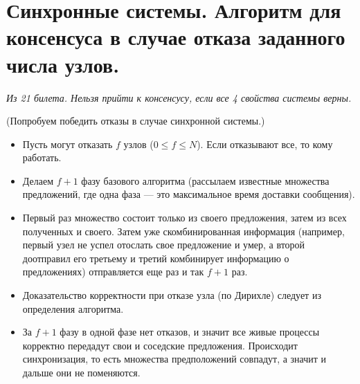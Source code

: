 \section{Синхронные системы. Алгоритм для консенсуса в случае отказа заданного числа узлов.}

\textit{ Из 21 билета. Нельзя прийти к консенсусу, если все 4 свойства системы верны. }

\begin{algorithm} (Попробуем победить отказы в случае синхронной системы.)
    \begin{itemize}
        \item Пусть могут отказать $f$ узлов ($0 \leq f \le N$). Если отказывают все, то кому работать.
        \item Делаем $f + 1$ фазу базового алгоритма (рассылаем известные множества предложений,
            где одна фаза --- это максимальное время доставки сообщения).
        \item Первый раз множество состоит только из своего предложения, затем из всех полученных и своего.
            Затем уже скомбинированная информация (например, первый узел не успел отослать свое предложение и умер,
            а второй доотправил его третьему и третий комбинирует информацию о предложениях)
            отправляется еще раз и так $f + 1$ раз.
        \item Доказательство корректности при отказе узла (по Дирихле) следует из определения алгоритма.
        \item За $f + 1$ фазу в одной фазе нет отказов, и значит все живые процессы корректно передадут свои и соседские предложения.
            Происходит синхронизация, то есть множества предположений совпадут, а значит и дальше они не поменяются.
    \end{itemize}
\end{algorithm}